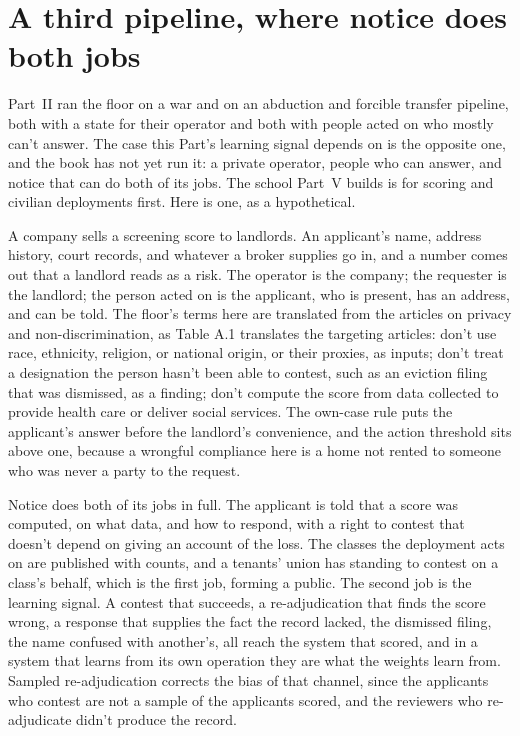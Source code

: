 \section{A third pipeline, where notice does both jobs}
\label{sec:23.8}
Part~II ran the floor on a war and on an abduction and forcible transfer pipeline, both with a state for their operator and both with people acted on who mostly can't answer. The case this Part's learning signal depends on is the opposite one, and the book has not yet run it: a private operator, people who can answer, and notice that can do both of its jobs. The school Part~V builds is for scoring and civilian deployments first. Here is one, as a hypothetical.

A company sells a screening score to landlords. An applicant's name, address history, court records, and whatever a broker supplies go in, and a number comes out that a landlord reads as a risk. The operator is the company; the requester is the landlord; the person acted on is the applicant, who is present, has an address, and can be told. The floor's terms here are translated from the articles on privacy and non-discrimination, as Table A.1 translates the targeting articles: don't use race, ethnicity, religion, or national origin, or their proxies, as inputs; don't treat a designation the person hasn't been able to contest, such as an eviction filing that was dismissed, as a finding; don't compute the score from data collected to provide health care or deliver social services. The own-case rule puts the applicant's answer before the landlord's convenience, and the action threshold sits above one, because a wrongful compliance here is a home not rented to someone who was never a party to the request.

Notice does both of its jobs in full. The applicant is told that a score was computed, on what data, and how to respond, with a right to contest that doesn't depend on giving an account of the loss. The classes the deployment acts on are published with counts, and a tenants' union has standing to contest on a class's behalf, which is the first job, forming a public. The second job is the learning signal. A contest that succeeds, a re-adjudication that finds the score wrong, a response that supplies the fact the record lacked, the dismissed filing, the name confused with another's, all reach the system that scored, and in a system that learns from its own operation they are what the weights learn from. Sampled re-adjudication corrects the bias of that channel, since the applicants who contest are not a sample of the applicants scored, and the reviewers who re-adjudicate didn't produce the record.

